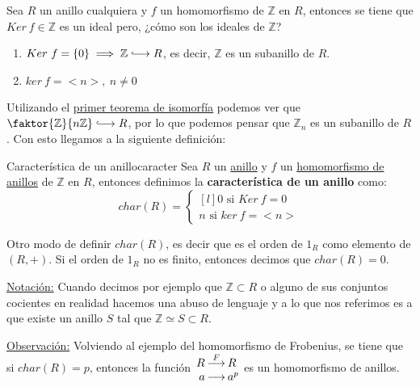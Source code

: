 \documentclass[10pt, a4paper]{article}
\newcommand{\Z}{\mathbb{Z}}
\newcommand{\obs}{\underline{Observación:} }
\newcommand{\nota}{\underline{Notación:} }
\newcommand{\anillo}[1][]{\hyperref[def:anillo]{anillo}#1 }
\newcommand{\longhookrightarrow}{\lhook\joinrel\longrightarrow}
\begin{document}
\vspace{3mm}

Sea $R$ un anillo cualquiera y $f$ un homomorfismo de $\Z$ en $R$, entonces se tiene que $Ker\ f \in \Z$ es un ideal pero, ¿cómo son los ideales de $\Z$?
\begin{enumerate}[label=\alph*)]
	\item $Ker\ f = \{0\} \implies \Z \longhookrightarrow R$, es decir, $\Z$ es un subanillo de $R$.
	\item $ker\ f = <n>,\ n \neq 0$
\end{enumerate}

Utilizando el \hyperref[theo:iso_1]{primer teorema de isomorfía} podemos ver que $\faktor{\Z}{n\Z} \longhookrightarrow R$, por lo que podemos pensar que $\Z_n$ es un subanillo de $R$. Con esto llegamos a la siguiente definición:

\begin{definition}{Característica de un anillo}{caracter}
Sea $R$ un \anillo y $f$ un \hyperref[def:homomorfismo]{homomorfismo de anillos} de $\Z$ en $R$, entonces definimos la \textbf{característica de un anillo} como:
\[
char(R) = \left \{
\begin{matrix*}[l]
	0 \text{ si } Ker\ f = 0 \\
	n \text{ si } ker\ f = <n>
\end{matrix*} \right .
\]

Otro modo de definir $char(R)$, es decir que es el orden de $1_R$ como elemento de $(R, +)$. Si el orden de $1_R$ no es finito, entonces decimos que $char(R) = 0$.
\end{definition}

\nota Cuando decimos por ejemplo que $\Z \subset R$ o alguno de sus conjuntos cocientes en realidad hacemos una abuso de lenguaje y a lo que nos referimos es a que existe un anillo $S$ tal que $\Z \simeq S \subset R$.

\vspace{3mm}


\obs Volviendo al ejemplo del homomorfismo de Frobenius, se tiene que si $char(R) = p$, entonces la función
$\arraycolsep=1pt
\begin{array}{rcl}
	R & \overset{F}{\longrightarrow} & R \\
	a & \longrightarrow & a^p
\end{array}
$ es un homomorfismo de anillos.
\end{document}
